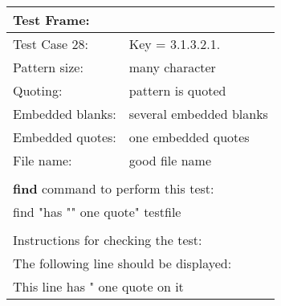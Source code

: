 \vspace{1cm}

\begin{tabular}{ll}
\hline
\multicolumn{2}{l}{ \textbf{Test Frame:} }			\\
\hline
Test Case 28:		&	{Key = 3.1.3.2.1.}			\\
Pattern size:		&	many character				\\
Quoting:			&	pattern is quoted			\\
Embedded blanks:	&	several embedded blanks		\\
Embedded quotes:	&	one embedded quotes			\\
File name:			&	good file name				\\
\multicolumn{2}{l}{ }											\\
\multicolumn{2}{l}{ \textbf{find} command to perform this test: }		\\
\multicolumn{2}{l}{ find "has "" one quote" testfile }			\\
\multicolumn{2}{l}{ }											\\
\multicolumn{2}{l}{ Instructions for checking the test: }		\\
\multicolumn{2}{l}{ The following line should be displayed: }	\\
\multicolumn{2}{l}{ This line has " one quote on it }			\\
\hline
\end{tabular}